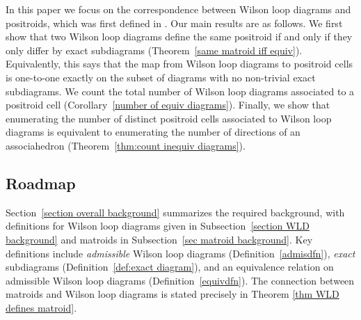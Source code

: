 \documentclass[11pt]{article}
\newcommand{\hlfix}[2]{\texthl{#1}\todo{#2}}
\theoremstyle{remark}
\theoremstyle{definition}
\begin{document}
In this paper we focus on the correspondence between Wilson loop diagrams and positroids, which was first defined in \cite{wilsonloop}. Our main results are as follows. We first show that two Wilson loop diagrams define the same positroid if and only if they only differ by exact subdiagrams (Theorem~\ref{same matroid iff equiv}). Equivalently, this says that the map from Wilson loop diagrams to positroid cells is one-to-one exactly on the subset of diagrams with no non-trivial exact subdiagrams. We count the total number of Wilson loop diagrams associated to a positroid cell (Corollary~\ref{number of equiv diagrams}). Finally, we show that enumerating the number of distinct positroid cells associated to Wilson loop diagrams is equivalent to enumerating the number of directions of an associahedron (Theorem~\ref{thm:count inequiv diagrams}).



\subsection{Roadmap}

Section~\ref{section overall background} summarizes the required background, with definitions for Wilson loop diagrams given in Subsection~\ref{section WLD background} and matroids in Subsection~\ref{sec matroid background}. Key definitions include {\em admissible} Wilson loop diagrams (Definition~\ref{admisdfn}), {\em exact} subdiagrams (Definition~\ref{def:exact diagram}), and an equivalence relation on admissible Wilson loop diagrams (Definition~\ref{equivdfn}).  The connection between matroids and Wilson loop diagrams is stated precisely in Theorem \ref{thm WLD defines matroid}.
\end{document}
